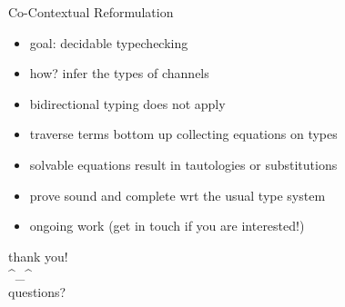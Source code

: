 \documentclass[dvipsnames]{beamer}
\newcommand{\sitem}{\item[\raisebox{.45ex}{\rule{.6ex}{.6ex}}]}
\begin{document}
  \begin{frame}{Co-Contextual Reformulation}
    \begin{itemize}
      \sitem goal: decidable typechecking
      \sitem how? infer the types of channels
      \sitem bidirectional typing does not apply
      \sitem traverse terms bottom up collecting equations on types
      \sitem solvable equations result in tautologies or substitutions
      \sitem prove sound and complete wrt the usual type system
      \sitem ongoing work (get in touch if you are interested!)
    \end{itemize}
  \end{frame}

  \begin{frame}
    \centering
    \Huge{thank you!} \\
    \Huge{\textasciicircum{}\_\textasciicircum{}} \\
    \Huge{questions?}
  \end{frame}
\end{document}
